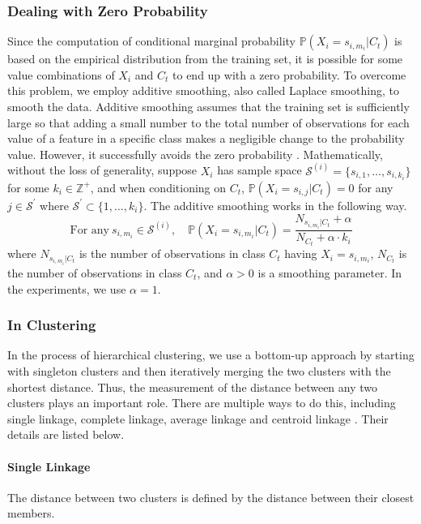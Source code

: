 \documentclass[twoside,11pt]{article}
\begin{document}
\subsubsection{Dealing with Zero Probability}\label{zero_prob}
Since the computation of conditional marginal probability $\mathbb{P}(X_i=s_{i,m_i}|C_t)$ is based on the empirical distribution from the training set, it is possible for some value combinations of $X_i$ and $C_t$ to end up with a zero probability. To overcome this problem, we employ additive smoothing, also called Laplace smoothing, to smooth the data. Additive smoothing assumes that the training set is sufficiently large so that adding a small number to the total number of observations for each value of a feature in a specific class makes a negligible change to the probability value. However, it successfully avoids the zero probability \citep{han2011data}. Mathematically, without the loss of generality, suppose $X_i$ has sample space $\mathcal{S}^{(i)}=\{s_{i,1},\dots,s_{i,k_i}\}$ for some $k_i\in \mathbb{Z}^{+}$, and when conditioning on $C_t$, $\mathbb{P}(X_i=s_{i,j}|C_t)=0$ for any $j\in \mathcal{S}^{'}$ where $\mathcal{S}^{'}\subset \{1,\dots,k_i\}$. The additive smoothing works in the following way.
\begin{displaymath}
\text{For any}\ s_{i,m_i}\in \mathcal{S}^{(i)}, \quad \mathbb{P}(X_i=s_{i,m_i}|C_t)=\frac{N_{s_{i,m_i}|C_t}+\alpha}{N_{C_t}+\alpha\cdot k_i}
\end{displaymath}
where $N_{s_{i,m_i}|C_t}$ is the number of observations in class $C_t$ having $X_i=s_{i,m_i}$, $N_{C_t}$ is the number of observations in class $C_t$, and $\alpha >0$ is a smoothing parameter. In the experiments, we use $\alpha =1$.

\subsubsection{In Clustering}\label{in_clustering}
In the process of hierarchical clustering, we use a bottom-up approach by starting with singleton clusters and then iteratively merging the two clusters with the shortest distance. Thus, the measurement of the distance between any two clusters plays an important role. There are multiple ways to do this, including single linkage, complete linkage, average linkage and centroid linkage \citep{han2011data}. Their details are listed below.

\paragraph{Single Linkage}
The distance between two clusters is defined by the distance between their closest members.
\end{document}
